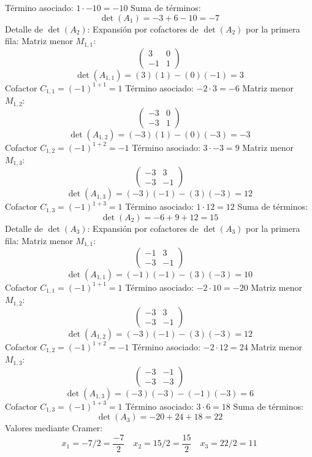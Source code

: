 \documentclass{article}
\begin{document}
Término asociado: $ 1 \cdot -10 = -10 $
Suma de términos:
\[\det(A_{1}) = -3 + 6 - 10 = -7\]
Detalle de $\det(A_{2})$:
Expansión por cofactores de $\det(A_{2})$ por la primera fila:
Matriz menor $M_{1,1}$:
\[\begin{pmatrix}3 & 0 \\ -1 & 1\end{pmatrix}\]
\[\det(A_{1,1}) = (3)(1) - (0)(-1) = 3\]
Cofactor $C_{1,1} = (-1)^{1+1} = 1$
Término asociado: $ -2 \cdot 3 = -6 $
Matriz menor $M_{1,2}$:
\[\begin{pmatrix}-3 & 0 \\ -3 & 1\end{pmatrix}\]
\[\det(A_{1,2}) = (-3)(1) - (0)(-3) = -3\]
Cofactor $C_{1,2} = (-1)^{1+2} = -1$
Término asociado: $ 3 \cdot -3 = 9 $
Matriz menor $M_{1,3}$:
\[\begin{pmatrix}-3 & 3 \\ -3 & -1\end{pmatrix}\]
\[\det(A_{1,3}) = (-3)(-1) - (3)(-3) = 12\]
Cofactor $C_{1,3} = (-1)^{1+3} = 1$
Término asociado: $ 1 \cdot 12 = 12 $
Suma de términos:
\[\det(A_{2}) = -6 + 9 + 12 = 15\]
Detalle de $\det(A_{3})$:
Expansión por cofactores de $\det(A_{3})$ por la primera fila:
Matriz menor $M_{1,1}$:
\[\begin{pmatrix}-1 & 3 \\ -3 & -1\end{pmatrix}\]
\[\det(A_{1,1}) = (-1)(-1) - (3)(-3) = 10\]
Cofactor $C_{1,1} = (-1)^{1+1} = 1$
Término asociado: $ -2 \cdot 10 = -20 $
Matriz menor $M_{1,2}$:
\[\begin{pmatrix}-3 & 3 \\ -3 & -1\end{pmatrix}\]
\[\det(A_{1,2}) = (-3)(-1) - (3)(-3) = 12\]
Cofactor $C_{1,2} = (-1)^{1+2} = -1$
Término asociado: $ -2 \cdot 12 = 24 $
Matriz menor $M_{1,3}$:
\[\begin{pmatrix}-3 & -1 \\ -3 & -3\end{pmatrix}\]
\[\det(A_{1,3}) = (-3)(-3) - (-1)(-3) = 6\]
Cofactor $C_{1,3} = (-1)^{1+3} = 1$
Término asociado: $ 3 \cdot 6 = 18 $
Suma de términos:
\[\det(A_{3}) = -20 + 24 + 18 = 22\]
Valores mediante Cramer:
\[x_1 = -7/2 = \frac{-7}{2}\quad x_2 = 15/2 = \frac{15}{2}\quad x_3 = 22/2 = 11\]
\end{document}
